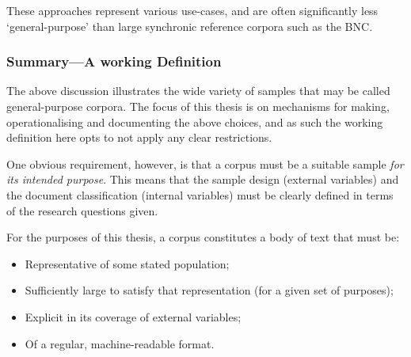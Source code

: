 These approaches represent various use-cases, and are often significantly less `general-purpose' than large synchronic reference corpora such as the BNC.








\subsubsection{Summary---A working Definition}
The above discussion illustrates the wide variety of samples that may be called general-purpose corpora.  The focus of this thesis is on mechanisms for making, operationalising and documenting the above choices, and as such the working definition here opts to not apply any clear restrictions.

One obvious requirement, however, is that a corpus must be a suitable sample \textsl{for its intended purpose}.  This means that the sample design (external variables) and the document classification (internal variables) must be clearly defined in terms of the research questions given.

For the purposes of this thesis, a corpus constitutes a body of text that must be:

\begin{itemize}
    \item Representative of some stated population;
    \item Sufficiently large to satisfy that representation (for a given set of purposes);
    \item Explicit in its coverage of external variables;
    \item Of a regular, machine-readable format.
\end{itemize}


% 
% 
% 
% 
% 












